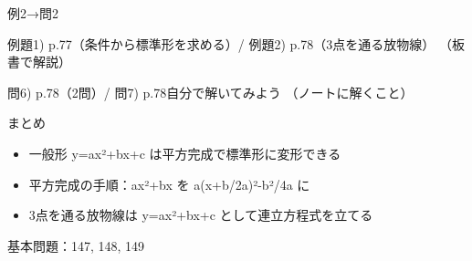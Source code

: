 \documentclass[aspectratio=43,professionalfonts,handout]{beamer}
\begin{document}
\begin{frame}{例2→問2}
  \begin{exampleblock}{例題1) p.77（条件から標準形を求める）/ 例題2) p.78（3点を通る放物線）}
    （板書で解説）
  \end{exampleblock}

  \vfill

  \begin{block}{問6) p.78（2問）/ 問7) p.78\quad 自分で解いてみよう}
    （ノートに解くこと）
  \end{block}
\end{frame}

\begin{frame}{まとめ}
  \begin{itemize}
    \item 一般形 y=ax²+bx+c は平方完成で標準形に変形できる
    \item 平方完成の手順：ax²+bx を a(x+b/2a)²-b²/4a に
    \item 3点を通る放物線は y=ax²+bx+c として連立方程式を立てる
  \end{itemize}

  \vfill
  {\small 基本問題：147, 148, 149}
\end{frame}
\end{document}
